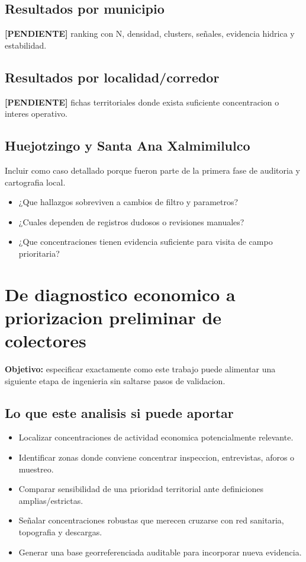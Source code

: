 \documentclass[11pt,letterpaper]{article}
\newcommand{\pendiente}{\textcolor{AtoyacRed}{\textbf{[PENDIENTE]}}}
\begin{document}
\subsection{Resultados por municipio}
\pendiente\; ranking con N, densidad, clusters, señales, evidencia hidrica y estabilidad.

\subsection{Resultados por localidad/corredor}
\pendiente\; fichas territoriales donde exista suficiente concentracion o interes operativo.

\subsection{Huejotzingo y Santa Ana Xalmimilulco}
Incluir como caso detallado porque fueron parte de la primera fase de auditoria y cartografia local.

\begin{preguntas}
\begin{itemize}
    \item ¿Que hallazgos sobreviven a cambios de filtro y parametros?
    \item ¿Cuales dependen de registros dudosos o revisiones manuales?
    \item ¿Que concentraciones tienen evidencia suficiente para visita de campo prioritaria?
\end{itemize}
\end{preguntas}

\section{De diagnostico economico a priorizacion preliminar de colectores}

\textbf{Objetivo:} especificar exactamente como este trabajo puede alimentar una siguiente etapa de ingenieria sin saltarse pasos de validacion.

\subsection{Lo que este analisis si puede aportar}
\begin{itemize}
    \item Localizar concentraciones de actividad economica potencialmente relevante.
    \item Identificar zonas donde conviene concentrar inspeccion, entrevistas, aforos o muestreo.
    \item Comparar sensibilidad de una prioridad territorial ante definiciones amplias/estrictas.
    \item Señalar concentraciones robustas que merecen cruzarse con red sanitaria, topografia y descargas.
    \item Generar una base georreferenciada auditable para incorporar nueva evidencia.
\end{itemize}
\end{document}
